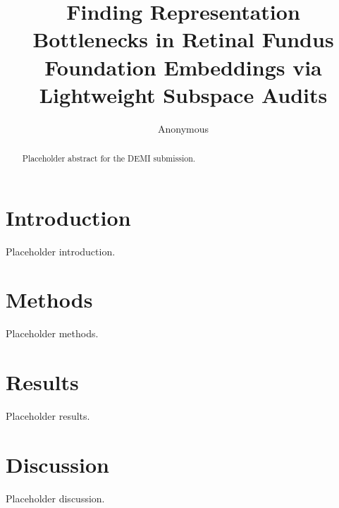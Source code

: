 \documentclass[runningheads]{llncs}
\begin{document}
\title{Finding Representation Bottlenecks in Retinal Fundus Foundation Embeddings via Lightweight Subspace Audits}

\author{Anonymous}

\maketitle

\begin{abstract}
Placeholder abstract for the DEMI submission.
\end{abstract}

\section{Introduction}

Placeholder introduction.

\section{Methods}

Placeholder methods.

\section{Results}

Placeholder results.

\section{Discussion}

Placeholder discussion.



\end{document}
